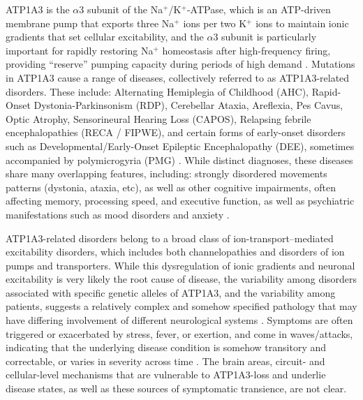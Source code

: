 \documentclass[9.5pt,lineno]{RandlettLab_elife}
\begin{document}
ATP1A3 is the $\alpha$3 subunit of the Na$^+$/K$^+$-ATPase, which is an ATP-driven membrane pump that exports three Na$^+$ ions per two K$^+$ ions to maintain ionic gradients that set cellular excitability, and the $\alpha$3 subunit is particularly important for rapidly restoring Na$^+$ homeostasis after high-frequency firing, providing “reserve” pumping capacity during periods of high demand \citep{Holm2016-ru}.
Mutations in ATP1A3 cause a range of diseases, collectively referred to as ATP1A3-related disorders. 
These include: Alternating Hemiplegia of Childhood (AHC), Rapid-Onset Dystonia-Parkinsonism (RDP), Cerebellar Ataxia, Areflexia, Pes Cavus, Optic Atrophy, Sensorineural Hearing Loss (CAPOS), Relapsing febrile encephalopathies (RECA / FIPWE), and certain forms of early-onset disorders such as Developmental/Early-Onset Epileptic Encephalopathy (DEE), sometimes accompanied by polymicrogyria (PMG) \citep{Salles2021-bq, Li2022-wx, Vezyroglou2022-co}. 
While distinct diagnoses, these diseases share many overlapping features, including: strongly disordered movements patterns (dystonia, ataxia, etc), as well as other cognitive impairments, often affecting memory, processing speed, and executive function, as well as psychiatric manifestations such as mood disorders and anxiety \citep{Pittock2000-tq, Sweney2009-ky}. 

ATP1A3-related disorders belong to a broad class of ion-transport–mediated excitability disorders, which includes both channelopathies and disorders of ion pumps and transporters.
While this dysregulation of ionic gradients and neuronal excitability is very likely the root cause of disease, the variability among disorders associated with specific genetic alleles of ATP1A3, and the variability among patients, suggests a relatively complex and somehow specified pathology that may have differing involvement of different neurological systems \citep{Li2022-wx}.
Symptoms are often triggered or exacerbated by stress, fever, or exertion, and come in waves/attacks, indicating that the underlying disease condition is somehow transitory and correctable, or varies in severity across time \citep{Salles2021-bq}.
The brain areas, circuit- and cellular-level mechanisms that are vulnerable to ATP1A3-loss and underlie disease states, as well as these sources of symptomatic transience, are not clear.
\end{document}
